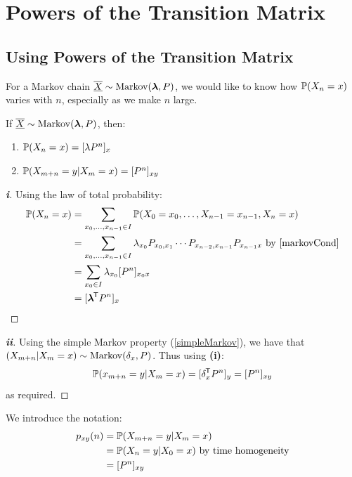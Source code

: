 \documentclass[../main.tex]{subfiles}
\begin{document}
\section{Powers of the Transition Matrix}
\subsection{Using Powers of the Transition Matrix}
For a Markov chain $\mchain{X} \sim \markov(\vec{\lambda}, P)$, we would like to know how $\P(X_n = x)$ varies with $n$, especially as we make $n$ large.
\begin{proposition}
  If $\mchain{X} \sim \markov(\vec{\lambda}, P)$, then: \label{transitionPowers}
  \begin{enumerate}
    \item $\P(X_n = x) = [\lambda P^n]_x$
    \item $\P(X_{m + n} = y \vert X_m = x) = [P^{n}]_{x y}$
  \end{enumerate}
\end{proposition}
\begin{proof}[\textbf{i}]
  Using the law of total probability:
  \begin{align*}
    \P(X_n = x) &= \sum_{x_0, \ldots, x_{n - 1} \in I} \P(X_0 = x_0, \ldots, X_{n - 1} = x_{n - 1}, X_n = x) \\
                &= \sum_{x_0, \ldots, x_{n - 1} \in I} \lambda_{x_0} P_{x_0, x_1} \cdots P_{x_{n - 2}, x_{n - 1}}P_{x_{n - 1} x} \text{ by \cref{markovCond}} \\
                &= \sum_{x_0 \in I} \lambda_{x_0} [P^n]_{x_0 x} \\
                &= [\vec{\lambda}^{\trans} P^{n}]_x
  \end{align*}
\end{proof}
\begin{proof}[\textbf{ii}]
  Using the simple Markov property (\cref{simpleMarkov}), we have that $(X_{m + n} \vert X_m = x) \sim \markov(\delta_x, P)$.
  Thus using \textbf{(i)}:
  \[
    \P(x_{m + n} = y \vert X_m = x) = [\delta^{\trans}_x P^{n}]_y = [P^n]_{x y}
  \]
  as required.
\end{proof}
\begin{remark}[Notation]
  We introduce the notation:
  \begin{align*}
    p_{x y}(n) &= \P(X_{m + n} = y \vert X_m = x) \\
               &= \P(X_n = y \vert X_0 = x) \text{ by time homogeneity} \\
               &= [P^n]_{x y}
  \end{align*}
\end{remark}
\end{document}
